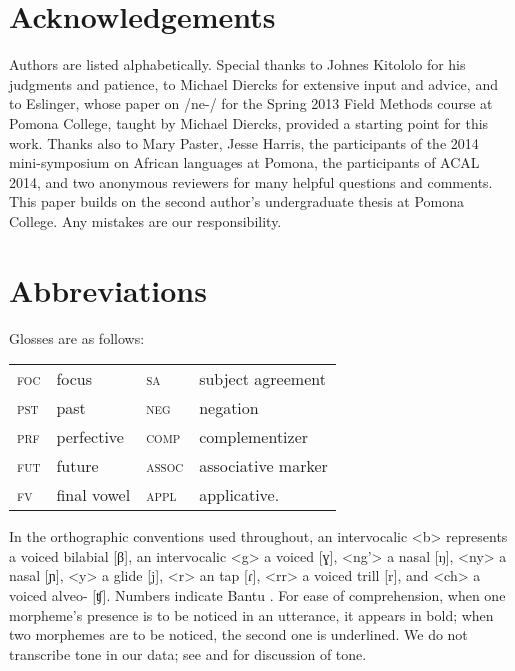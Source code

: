 \documentclass[output=paper,modfonts]{langscibook}
\begin{document}
\section*{Acknowledgements}

Authors are listed alphabetically. Special thanks to Johnes Kitololo for his judgments and patience, to Michael Diercks for extensive input and advice, and to  Eslinger, whose paper on  /ne-/ for the Spring 2013 Field Methods course at Pomona College, taught by Michael Diercks, provided a starting point for this work. Thanks also to Mary Paster, Jesse Harris, the participants of the 2014 mini-symposium on African languages at Pomona, the participants of ACAL 2014, and two anonymous reviewers for many helpful questions and comments. This paper builds on the second author’s undergraduate thesis at Pomona College. Any mistakes are our responsibility.

\section*{Abbreviations}
Glosses are as follows:

\bigskip
\begin{tabularx}{.9\textwidth}{lQlQ}
 \textsc{foc} &  {focus} &       \textsc{sa} &  {subject agreement}\\
 \textsc{pst} & past &        \textsc{neg} &  {negation}\\
 \textsc{prf} &  {perfective} &  \textsc{comp} &  {complementizer}\\
 \textsc{fut} & future &      \textsc{assoc} & associative marker\\
 \textsc{fv} & final vowel &  \textsc{appl} &  {applicative}.
\end{tabularx}
\bigskip

In the orthographic conventions used throughout, an intervocalic <b> represents a voiced bilabial  [β], an intervocalic <g> a voiced   [ɣ],  <ng’> a  nasal [ŋ], <ny> a  nasal [ɲ], <y> a  glide [j], <r> an  tap [ɾ], <rr> a voiced  trill [r], and <ch> a voiced alveo-  [ʧ]. Numbers indicate Bantu . For ease of comprehension, when one morpheme’s presence is to be noticed in an utterance, it appears in bold; when two morphemes are to be noticed, the second one is underlined. We do not transcribe tone in our data; see \citet{Mwita2008} and \citet{MarloEtAl2014kuriamelody,MarloEtAl2014kuriaH} for discussion of  tone.

  
{\sloppy
\printbibliography[heading=subbibliography,notkeyword=this]
}
\end{document}
